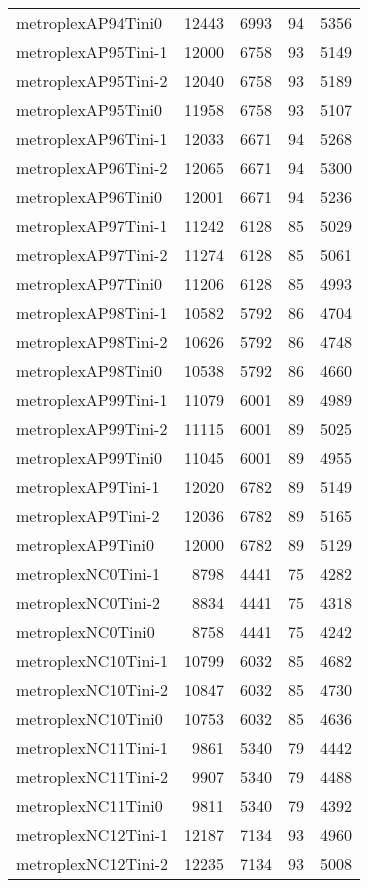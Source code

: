 \begin{longtable}{lrrrr}
metroplexAP94Tini0 & 12443 & 6993 & 94 & 5356 \\
metroplexAP95Tini-1 & 12000 & 6758 & 93 & 5149 \\
metroplexAP95Tini-2 & 12040 & 6758 & 93 & 5189 \\
metroplexAP95Tini0 & 11958 & 6758 & 93 & 5107 \\
metroplexAP96Tini-1 & 12033 & 6671 & 94 & 5268 \\
metroplexAP96Tini-2 & 12065 & 6671 & 94 & 5300 \\
metroplexAP96Tini0 & 12001 & 6671 & 94 & 5236 \\
metroplexAP97Tini-1 & 11242 & 6128 & 85 & 5029 \\
metroplexAP97Tini-2 & 11274 & 6128 & 85 & 5061 \\
metroplexAP97Tini0 & 11206 & 6128 & 85 & 4993 \\
metroplexAP98Tini-1 & 10582 & 5792 & 86 & 4704 \\
metroplexAP98Tini-2 & 10626 & 5792 & 86 & 4748 \\
metroplexAP98Tini0 & 10538 & 5792 & 86 & 4660 \\
metroplexAP99Tini-1 & 11079 & 6001 & 89 & 4989 \\
metroplexAP99Tini-2 & 11115 & 6001 & 89 & 5025 \\
metroplexAP99Tini0 & 11045 & 6001 & 89 & 4955 \\
metroplexAP9Tini-1 & 12020 & 6782 & 89 & 5149 \\
metroplexAP9Tini-2 & 12036 & 6782 & 89 & 5165 \\
metroplexAP9Tini0 & 12000 & 6782 & 89 & 5129 \\
metroplexNC0Tini-1 & 8798 & 4441 & 75 & 4282 \\
metroplexNC0Tini-2 & 8834 & 4441 & 75 & 4318 \\
metroplexNC0Tini0 & 8758 & 4441 & 75 & 4242 \\
metroplexNC10Tini-1 & 10799 & 6032 & 85 & 4682 \\
metroplexNC10Tini-2 & 10847 & 6032 & 85 & 4730 \\
metroplexNC10Tini0 & 10753 & 6032 & 85 & 4636 \\
metroplexNC11Tini-1 & 9861 & 5340 & 79 & 4442 \\
metroplexNC11Tini-2 & 9907 & 5340 & 79 & 4488 \\
metroplexNC11Tini0 & 9811 & 5340 & 79 & 4392 \\
metroplexNC12Tini-1 & 12187 & 7134 & 93 & 4960 \\
metroplexNC12Tini-2 & 12235 & 7134 & 93 & 5008 \\

\end{longtable}
